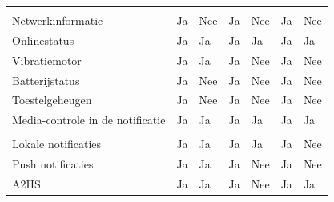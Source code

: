 \begin{table}[]
\begin{tabular}{p{6cm}p{13mm}p{15mm}p{13mm}p{13mm}p{13mm}p{13mm}}
				 &  & &  &  &  &  \\
				 
				  Netwerkinformatie & \cellcolor{green!40} Ja  &  \cellcolor{red!50} Nee & \cellcolor{green!40} Ja  & \cellcolor{red!50} Nee & \cellcolor{green!40} Ja &  \cellcolor{red!50} Nee \\
				  
				  Onlinestatus & \cellcolor{green!40} Ja  & \cellcolor{green!40} Ja & \cellcolor{green!40} Ja  & \cellcolor{green!40} Ja & \cellcolor{green!40} Ja & \cellcolor{green!40} Ja \\
				  
				  Vibratiemotor & \cellcolor{green!40} Ja  & \cellcolor{green!40} Ja & \cellcolor{green!40} Ja & \cellcolor{red!50} Nee  & \cellcolor{green!40} Ja & \cellcolor{red!50} Nee \\
				  
				  Batterijstatus & \cellcolor{green!40} Ja  &  \cellcolor{red!50} Nee & \cellcolor{green!40} Ja  & \cellcolor{red!50} Nee & \cellcolor{green!40} Ja &  \cellcolor{red!50} Nee \\
				  
				  Toestelgeheugen & \cellcolor{green!40} Ja  &  \cellcolor{red!50} Nee & \cellcolor{green!40} Ja  & \cellcolor{red!50} Nee & \cellcolor{green!40} Ja &  \cellcolor{red!50} Nee \\
				  
				  Media-controle in de notificatie & \cellcolor{green!40} Ja  & \cellcolor{green!40} Ja & \cellcolor{green!40} Ja  & \cellcolor{green!40} Ja & \cellcolor{green!40} Ja & \cellcolor{green!40} Ja \\
				  
				   &  & &  &  &  &  \\
				   
				   Lokale notificaties & \cellcolor{green!40} Ja  & \cellcolor{green!40} Ja & \cellcolor{green!40} Ja  & \cellcolor{green!40} Ja & \cellcolor{green!40} Ja &  \cellcolor{red!50} Nee \\
				   
				   Push notificaties  & \cellcolor{green!40} Ja  & \cellcolor{green!40} Ja & \cellcolor{green!40} Ja & \cellcolor{red!50} Nee  & \cellcolor{green!40} Ja & \cellcolor{red!50} Nee \\
				   
				   A2HS & \cellcolor{green!40} Ja  & \cellcolor{green!40} Ja & \cellcolor{green!40} Ja & \cellcolor{red!50} Nee  & \cellcolor{green!40} Ja & \cellcolor{green!40} Ja \\
				   

\end{tabular}
\end{table}
